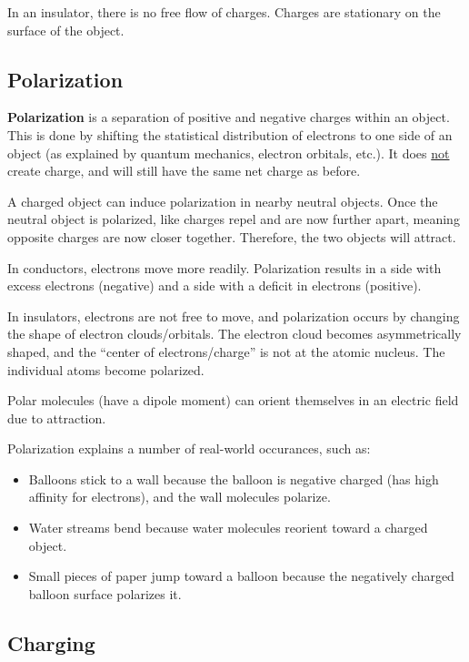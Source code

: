 \documentclass{article}
\newcommand{\definition}[1]{\begin{tcolorbox}[colback=red!5!white,colframe=red!75!black,parbox=false] #1 \end{tcolorbox}}
\newcommand{\theorem}[2]{\begin{tcolorbox}[title={#1},colback=blue!5!white,colframe=blue!75!black,parbox=false] #2 \end{tcolorbox}}
\begin{document}
\theorem*{
	In an insulator, there is no free flow of charges. Charges are stationary on the surface of the object.
}

\subsection{Polarization}

\definition{\textbf{Polarization} is a separation of positive and negative charges within an object. This is done by shifting the statistical distribution of electrons to one side of an object (as explained by quantum mechanics, electron orbitals, etc.). It does \ul{not} create charge, and will still have the same net charge as before.}

A charged object can induce polarization in nearby neutral objects. Once the neutral object is polarized, like charges repel and are now further apart, meaning opposite charges are now closer together. Therefore, the two objects will attract.

In conductors, electrons move more readily. Polarization results in a side with excess electrons (negative) and a side with a deficit in electrons (positive).

In insulators, electrons are not free to move, and polarization occurs by changing the shape of electron clouds/orbitals. The electron cloud becomes asymmetrically shaped, and the ``center of electrons/charge'' is not at the atomic nucleus. The individual atoms become polarized.

Polar molecules (have a dipole moment) can orient themselves in an electric field due to attraction.

Polarization explains a number of real-world occurances, such as:
\begin{itemize}
	\item Balloons stick to a wall because the balloon is negative charged (has high affinity for electrons), and the wall molecules polarize.
	\item Water streams bend because water molecules reorient toward a charged object.
	\item Small pieces of paper jump toward a balloon because the negatively charged balloon surface polarizes it.
\end{itemize}

\subsection{Charging}
\end{document}
